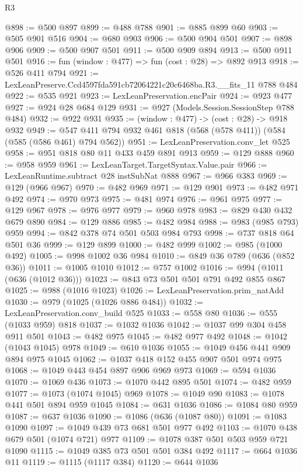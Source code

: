 \begin{lexlean}{R3}
\begin{coremodule}
@898 := @500 @897
@899 := @488 @788
@901 := @885 @899 @60
@903 := @505 @901 @516
@904 := @680 @903
@906 := @500 @904 @501
@907 := @898 @906
@909 := @500 @907 @501
@911 := @500 @909 @894
@913 := @500 @911 @501
@916 := fun (window : @477) => fun (cost : @28) => @892 @913
@918 := @526 @411 @794
@921 := LexLeanPreserve.Ccd4597fda591cb72064221c20c6468ba.R3.__fits_11 @788 @484
@922 := @535 @921
@923 := LexLeanPreservation.encPair
@924 := @923 @477
@927 := @924 @28 @684 @129
@931 := @927 (Models.Session.SessionStep @788 @484)
@932 := @922 @931
@935 := (window : @477) -> (cost : @28) -> @918 @932
@949 := @547 @411 @794 @932 @461 @818 (@568 (@578 @411)) (@584 (@585 (@586 @461) @794 @562))
@951 := LexLeanPreservation.conv_let @525
@958 := @951 @818 @80 @11 @433 @459 @891 @913
@959 := @129 @888
@960 := @958 @959
@961 := LexLeanTarget.TargetSyntax.Value.pair
@966 := LexLeanRuntime.subtract @28 instSubNat @888
@967 := @966 @383
@969 := @129 (@966 @967)
@970 := @482 @969
@971 := @129 @901
@973 := @482 @971 @492
@974 := @970 @973
@975 := @481 @974
@976 := @961 @975
@977 := @129 @967
@978 := @976 @977
@979 := @960 @978
@983 := @829 @430 @432 @679 @890
@984 := @129 @886
@985 := @482 @984
@988 := @983 (@985 @793) @959
@994 := @842 @378 @74 @501 @503 @984 @793
@998 := @737 @818 @64 @501 @36
@999 := @129 @899
@1000 := @482 @999
@1002 := @985 (@1000 @492)
@1005 := @998 @1002 @36 @984
@1010 := @849 @36 @789 (@636 (@852 @36))
@1011 := @1005 @1010
@1012 := @757 @1002
@1016 := @994 (@1011 (@636 (@1012 @36)))
@1023 := @843 @73 @501 @501 @791 @492 @855 @867
@1025 := @988 (@1016 @1023)
@1026 := LexLeanPreservation.prim_natAdd
@1030 := @979 (@1025 (@1026 @886 @484))
@1032 := LexLeanPreservation.conv_build @525
@1033 := @558 @80
@1036 := @555 (@1033 @959) @818
@1037 := @1032 @1036
@1042 := @1037 @99 @304 @458 @911 @501
@1043 := @482 @975
@1045 := @482 @977 @492
@1048 := @1042 (@1043 @1045) @978
@1049 := @610 @1036
@1055 := @1049 @456 @441 @909 @894 @975 @1045
@1062 := @1037 @418 @152 @455 @907 @501 @974 @975
@1068 := @1049 @443 @454 @897 @906 @969 @973
@1069 := @594 @1036
@1070 := @1069 @436
@1073 := @1070 @442 @895 @501
@1074 := @482 @959
@1077 := @1073 (@1074 @1045) @969
@1078 := @1049 @90
@1083 := @1078 @441 @501 @894 @959 @1045
@1084 := @631 @1036
@1086 := @1084 @80 @959
@1087 := @637 @1036
@1090 := @1086 (@636 (@1087 @80))
@1091 := @1083 @1090
@1097 := @1049 @439 @73 @681 @501 @977 @492
@1103 := @1070 @438 @679 @501 (@1074 @721) @977
@1109 := @1078 @387 @501 @503 @959 @721 @1090
@1115 := @1049 @385 @73 @501 @501 @384 @492
@1117 := @664 @1036 @11
@1119 := @1115 (@1117 @384)
@1120 := @644 @1036

\end{coremodule}
\end{lexlean}
